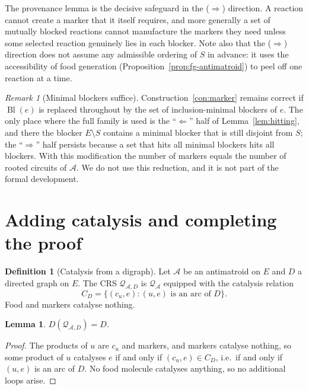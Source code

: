 \documentclass[11pt,a4paper]{article}
\theoremstyle{plain}
\newtheorem{lemma}[theorem]{Lemma}
\theoremstyle{definition}
\newtheorem{definition}[theorem]{Definition}
\theoremstyle{remark}
\newtheorem{remark}[theorem]{Remark}
\newcommand{\Bl}{\operatorname{Bl}}
\newcommand{\cA}{\mathcal{A}}
\newcommand{\cQ}{\mathcal{Q}}
\begin{document}
The provenance lemma is the decisive safeguard in the ($\Rightarrow$) direction. A reaction cannot create a marker that it itself requires, and more generally a set of mutually blocked reactions cannot manufacture the markers they need unless some selected reaction genuinely lies in each blocker. Note also that the ($\Rightarrow$) direction does not assume any admissible ordering of $S$ in advance: it uses the accessibility of food generation (Proposition~\ref{prop:fg-antimatroid}) to peel off one reaction at a time.

\begin{remark}[Minimal blockers suffice]\label{rem:minimal}
Construction~\ref{con:marker} remains correct if $\Bl(e)$ is replaced throughout by the set of inclusion-minimal blockers of $e$. The only place where the full family is used is the ``$\Leftarrow$'' half of Lemma~\ref{lem:hitting}, and there the blocker $E\setminus S$ contains a minimal blocker that is still disjoint from $S$; the ``$\Rightarrow$'' half persists because a set that hits all minimal blockers hits all blockers. With this modification the number of markers equals the number of rooted circuits of $\cA$. We do not use this reduction, and it is not part of the formal development.
\end{remark}

\section{Adding catalysis and completing the proof}\label{sec:catalysis}

\begin{definition}[Catalysis from a digraph]\label{def:catalysis}
Let $\cA$ be an antimatroid on $E$ and $D$ a directed graph on $E$. The CRS $\cQ_{\cA,D}$ is $\cQ_{\cA}$ equipped with the catalysis relation
\[
C_D=\{(c_u,e): (u,e)\text{ is an arc of }D\}.
\]
Food and markers catalyse nothing.
\end{definition}

\begin{lemma}\label{lem:DQ}
$D(\cQ_{\cA,D})=D$.
\end{lemma}

\begin{proof}
The products of $u$ are $c_u$ and markers, and markers catalyse nothing, so some product of $u$ catalyses $e$ if and only if $(c_u,e)\in C_D$, i.e.\ if and only if $(u,e)$ is an arc of $D$. No food molecule catalyses anything, so no additional loops arise.
\end{proof}
\end{document}
